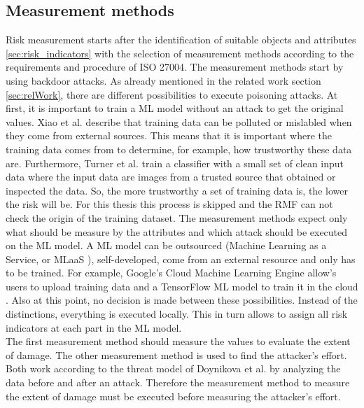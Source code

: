 \subsection{Measurement methods}

Risk measurement starts after the identification of suitable objects and attributes \ref{sec:risk_indicators} with the selection of measurement methods according to the requirements and procedure of ISO 27004. The measurement methods start by using backdoor attacks. As already mentioned in the related work section \ref{sec:relWork}, there are different possibilities to execute poisoning attacks. At first, it is important to train a ML model without an attack to get the original values.
Xiao et al. \cite{DBLP:conf/sp/XiaoLZX18} describe that training data can be polluted or mislabled when they come from external sources. This means that it is important where the training data comes from to determine, for example, how trustworthy these data are. Furthermore, Turner et al. \cite{turner2018clean} train a classifier with a
small set of clean input data where the input data are images from a trusted source that obtained or inspected the data. So, the more trustworthy a set of training data is, the lower the risk will be. For this thesis this process is skipped and the RMF can not check the origin of the training dataset. The measurement methods expect only what should be measure by the attributes and which attack should be executed on the ML model. A ML model can be outsourced (Machine Learning as a Service, or MLaaS \cite{DBLP:journals/corr/abs-1708-06733}), self-developed, come from an external resource and only has to be trained. For example, Google's Cloud Machine Learning Engine \cite{google_ai2022} allow's users to upload training data and a TensorFlow ML model to train it in the cloud \cite{DBLP:journals/corr/abs-1708-06733}. Also at this point, no decision is made between these possibilities. Instead of the distinctions, everything is executed locally. This in turn allows to assign all risk indicators at each part in the ML model. \\ The first measurement method should measure the values to evaluate the extent of damage. The other measurement method is used to find the attacker's effort. Both work according to the threat model of Doynikova et al. \cite{DBLP:conf/crisis/DoynikovaNGK20} by analyzing the data before and after an attack. Therefore the measurement method to measure the extent of
damage must be executed before measuring the attacker's effort.

